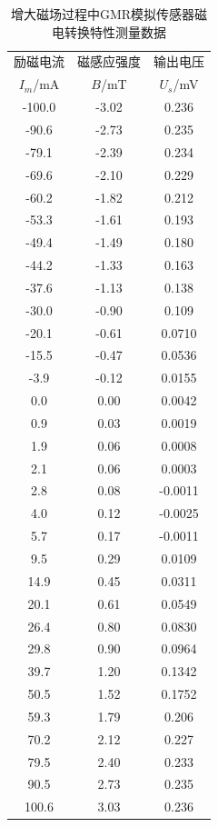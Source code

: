 \documentclass{thuemp}
\begin{document}
\begin{itemize}
\begin{table}[H]
    \centering
    \captionnamefont{\wuhao\bf\heiti}
    \captiontitlefont{\wuhao\bf\heiti}
    \caption{增大磁场过程中GMR模拟传感器磁电转换特性测量数据} \label{tab:gmrsenso_incr}
    \liuhao
    \begin{tabular}{ccc}
        \toprule
        励磁电流 & 磁感应强度 & 输出电压  \\
        $I_m$/\si{\milli\ampere} & $B$/\si{\milli\tesla} & $U_s$/\si{\milli\volt} \\
        \midrule
        -100.0 & -3.02 & 0.236    \\
        -90.6  & -2.73 & 0.235    \\
        -79.1  & -2.39 & 0.234    \\
        -69.6  & -2.10 & 0.229    \\
        -60.2  & -1.82 & 0.212    \\
        -53.3  & -1.61 & 0.193    \\
        -49.4  & -1.49 & 0.180    \\
        -44.2  & -1.33 & 0.163    \\
        -37.6  & -1.13 & 0.138    \\
        -30.0  & -0.90 & 0.109    \\
        -20.1  & -0.61 & 0.0710   \\
        -15.5  & -0.47 & 0.0536   \\
        -3.9   & -0.12 & 0.0155   \\
        0.0    & 0.00  & 0.0042   \\
        0.9    & 0.03  & 0.0019   \\
        1.9    & 0.06  & 0.0008   \\
        2.1    & 0.06  & 0.0003   \\
        2.8    & 0.08  & -0.0011  \\
        4.0    & 0.12  & -0.0025  \\
        5.7    & 0.17  & -0.0011  \\
        9.5    & 0.29  & 0.0109   \\
        14.9   & 0.45  & 0.0311   \\
        20.1   & 0.61  & 0.0549   \\
        26.4   & 0.80  & 0.0830   \\
        29.8   & 0.90  & 0.0964   \\
        39.7   & 1.20  & 0.1342   \\
        50.5   & 1.52  & 0.1752   \\
        59.3   & 1.79  & 0.206    \\
        70.2   & 2.12  & 0.227    \\
        79.5   & 2.40  & 0.233    \\
        90.5   & 2.73  & 0.235    \\
        100.6  & 3.03  & 0.236    \\
        \bottomrule
    \end{tabular}
\end{table}


\end{itemize}
\end{document}
